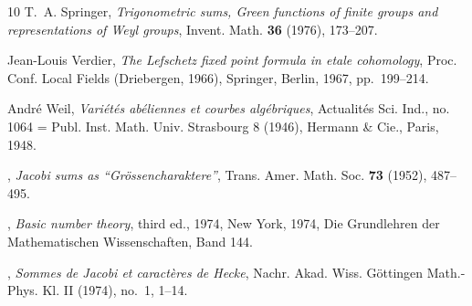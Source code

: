 \documentclass[12pt,oneside,english]{smfbook}
\newcounter{char}
\begin{document}
\begin{thebibliography}{10}
 T.~A. Springer, \emph{Trigonometric sums, {G}reen functions of finite groups and representations of {W}eyl groups}, Invent. Math. \textbf{36} (1976), 173--207.

 Jean-Louis Verdier, \emph{The {L}efschetz fixed point formula in etale cohomology}, Proc. {C}onf. {L}ocal {F}ields ({D}riebergen, 1966), Springer, Berlin, 1967, pp.~199--214. 

 Andr{\'e} Weil, \emph{Vari\'et\'es ab\'eliennes et courbes alg\'ebriques}, Actualit\'es Sci. Ind., no. 1064 = Publ. Inst. Math. Univ. Strasbourg 8 (1946), Hermann \& Cie., Paris, 1948. 

 \bysame, \emph{Jacobi sums as ``{G}r\"ossencharaktere''}, Trans. Amer. Math. Soc. \textbf{73} (1952), 487--495.

 \bysame, \emph{Basic number theory}, third ed., 1974, New York, 1974, Die Grundlehren der Mathematischen Wissenschaften, Band 144.

 \bysame, \emph{Sommes de {J}acobi et caract\`eres de {H}ecke}, Nachr. Akad. Wiss. G\"ottingen Math.-Phys. Kl. II (1974), no.~1, 1--14.

\end{thebibliography}
\end{document}
